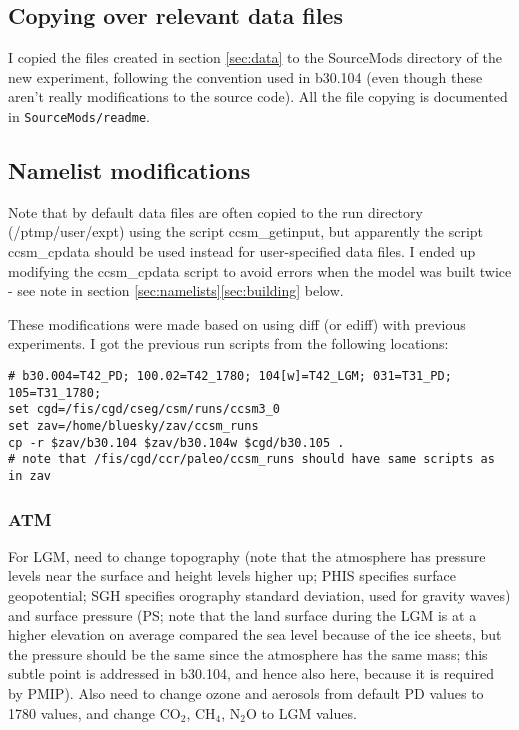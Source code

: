 \documentclass[authoryear,round,12pt]{article}
\begin{document}
\subsection{Copying over relevant data files}

I copied the files created in section \ref{sec:data} to the SourceMods
directory of the new experiment, following the convention used in
b30.104 (even though these aren't really modifications to the source
code). All the file copying is documented in \verb+SourceMods/readme+.

\subsection{Namelist modifications}

Note that by default data files are often copied to the run directory
(/ptmp/user/expt) using the script ccsm\_getinput, but apparently the
script ccsm\_cpdata should be used instead for user-specified data
files. I ended up modifying the ccsm\_cpdata script to avoid errors
when the model was built twice - see note in section
\ref{sec:namelists}\ref{sec:building} below.

These modifications were made based on using diff (or ediff) with
previous experiments. I got the previous run scripts from the
following locations:

\begin{verbatim}
# b30.004=T42_PD; 100.02=T42_1780; 104[w]=T42_LGM; 031=T31_PD; 105=T31_1780;
set cgd=/fis/cgd/cseg/csm/runs/ccsm3_0
set zav=/home/bluesky/zav/ccsm_runs
cp -r $zav/b30.104 $zav/b30.104w $cgd/b30.105 .
# note that /fis/cgd/ccr/paleo/ccsm_runs should have same scripts as in zav
\end{verbatim}

\subsubsection{ATM}

For LGM, need to change topography (note that the atmosphere has
pressure levels near the surface and height levels higher up; PHIS
specifies surface geopotential; SGH specifies orography standard
deviation, used for gravity waves) and surface pressure (PS; note that
the land surface during the LGM is at a higher elevation on average
compared the sea level because of the ice sheets, but the pressure
should be the same since the atmosphere has the same mass; this subtle
point is addressed in b30.104, and hence also here, because it is
required by PMIP). Also need to change ozone and aerosols from default
PD values to 1780 values, and change CO$_2$, CH$_4$, N$_2$O to LGM
values.
\end{document}
